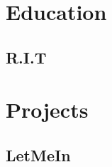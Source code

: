\documentclass{nf_resume_class}
\begin{document}
\leftskip 1in

\section{Education}
\noindent
\subsection{R.I.T}
\noindent

\section{Projects}
\noindent
\subsection{LetMeIn}
\end{document}
